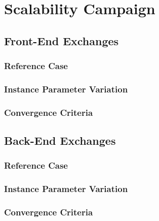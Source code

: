 
\section{Scalability Campaign}\label{results:scale}



\subsection{Front-End Exchanges}

\subsubsection{Reference Case}

\subsubsection{Instance Parameter Variation}

\subsubsection{Convergence Criteria}

\subsection{Back-End Exchanges}

\subsubsection{Reference Case}

\subsubsection{Instance Parameter Variation}

\subsubsection{Convergence Criteria}
